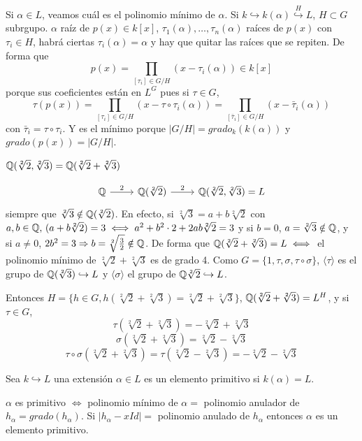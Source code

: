 Si $\alpha\in L$, veamos cu\'al es el polinomio m\'inimo de $\alpha$. Si $k \hookrightarrow k(\alpha) \overset{H}{\hookrightarrow} L$, $H\subset G$ subrgupo. $\alpha$ ra\'iz de $p(x) \in k[x]$, $\tau_1(\alpha), \ldots, \tau_n(\alpha)$ ra\'ices de $p(x)$ con $\tau_i\in H$, habr\'a ciertas $\tau_i(\alpha) = \alpha$ y hay que quitar las ra\'ices que se repiten. De forma que 
$$p(x) = \prod_{[\tau_i] \in G/H} (x-\tau_i(\alpha)) \in k[x] $$
porque sus coeficientes est\'an en $L^G$ pues si $\tau\in G$, 
$$\tau(p(x)) = \prod_{[\tau_i] \in G/H} (x-\tau\circ \tau_i(\alpha))=\prod_{[\bar\tau_i] \in G/H} (x-\bar \tau_i(\alpha))$$
con $\bar \tau_i = \tau \circ \tau_i$. Y es el m\'inimo porque $|G/H| = grado_k(k(\alpha))$ y $grado(p(x)) = |G/H|$. 
\begin{prop}
    $\mathbb{Q}(\sqrt[2]{2}, \sqrt[2]{3}) = \mathbb{Q}(\sqrt[2]{2}+\sqrt[2]{3})$
\end{prop}
\begin{dem}
    $$\bt \bb Q \rar{2}& \bb  Q(\sqrt[2]{2}) \rar{2} & \bb Q( \sqrt[2]{2} , \sqrt[2]{3}) = L \et$$
    siempre que $\sqrt[2]{3} \notin \mathbb{Q}(\sqrt[2]{2})$. En efecto, si $\sqrt[2]{3} = a+b \sqrt[2]{2}$ con $a,b \in \mathbb{Q}, \, (a+b\sqrt[2]{2})=3 \iff a^2+b^2\cdot 2+2ab\sqrt[2]{2}=3$ y si $b=0$, $a=\sqrt[2]{3} \notin \mathbb{Q}$, y si $a\neq 0$, $2b^2=3\Rightarrow b = \sqrt[2]{\frac{3}{2}} \notin \mathbb{Q}$. De forma que $\mathbb{Q}(\sqrt[2]{2}+\sqrt[2]{3})  =L \iff $ el polinomio m\'inimo de $\sqrt[2]{2}+\sqrt[2]{3}$ es de grado 4. Como $G = \{1,\tau, \sigma, \tau\circ \sigma\}$, $\langle \tau\rangle$ es el grupo de $\mathbb{Q}(\sqrt[2]{3}) \hookrightarrow L$ y $\langle \sigma\rangle$ el grupo de $\mathbb{Q}\sqrt[2]{2} \hookrightarrow L$. 

    Entonces $H = \{h\in G, h(\sqrt[2]{2}+\sqrt[2]{3}) = \sqrt[2]{2}+\sqrt[2]{3}\}$, $\mathbb{Q}(\sqrt[2]{2}+\sqrt[2]{3}) = L^H$, y si $\tau \in G$, 
    $$\tau(\sqrt[2]{2}+\sqrt[2]{3}) = -\sqrt[2]{2}+\sqrt[2]{3}$$
    $$\sigma(\sqrt[2]{2}+\sqrt[2]{3}) = \sqrt[2]{2}-\sqrt[2]{3}$$
    $$\tau \circ \sigma(\sqrt[2]{2}+\sqrt[2]{3}) = \tau(\sqrt[2]{2}-\sqrt[2]{3}) = -\sqrt[2]{2}-\sqrt[2]{3}$$
\end{dem}
\begin{defi}
Sea $k \hookrightarrow L$ una extensi\'on $\alpha \in L$ es un elemento primitivo si $k(\alpha) = L$. 
\end{defi}\begin{prop}
    $\alpha$ es primitivo $\iff$ polinomio m\'inimo de $\alpha = $ polinomio anulador de $h_{\alpha} = grado(h_{\alpha})$. Si $|h_{\alpha}-xId| = $ polinomio anulado de $h_{\alpha}$ entonces $\alpha$ es un elemento primitivo. 
\end{prop}
